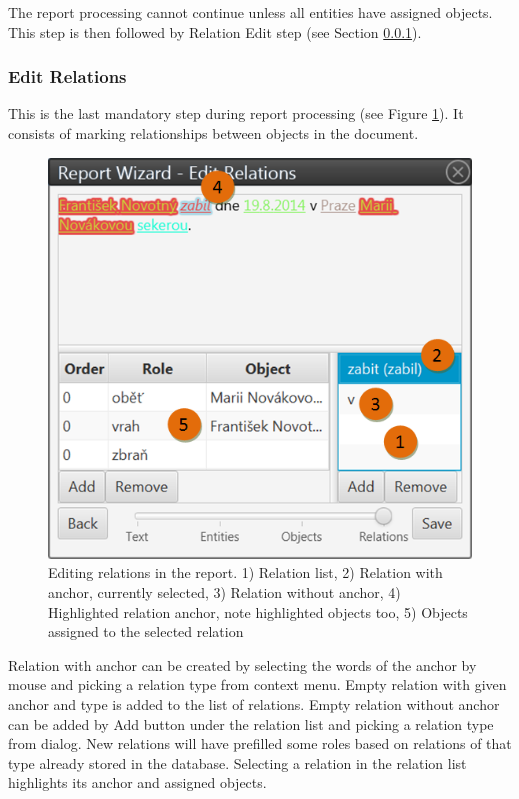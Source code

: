 The report processing cannot continue unless all entities have assigned
objects. This step is then followed by Relation Edit step (see Section
\ref{sssec:EditRelations}).

\subsubsection{Edit Relations}
\label{sssec:EditRelations}

This is the last mandatory step during report processing (see Figure
\ref{fig:Relations}). It consists of marking relationships between objects in
the document.

\begin{figure}[!htb]
        \centering
        \includegraphics[width=\textwidth]{Images/relations}
        \caption{Editing relations in the report. 1) Relation list, 2) Relation
		 with anchor, currently selected, 3) Relation without anchor, 4) Highlighted
		 relation anchor, note highlighted objects too, 5) Objects assigned to
		 the selected relation}
        \label{fig:Relations}
\end{figure}

Relation with anchor can be created by selecting the words of the anchor by
mouse and picking a relation type from context menu. Empty relation with given
anchor and type is added to the list of relations. Empty relation without anchor
can be added by Add button under the relation list and picking a relation type
from dialog. New relations will have prefilled some roles based on relations of
that type already stored in the database. Selecting a relation in the relation
list highlights its anchor and assigned objects.

